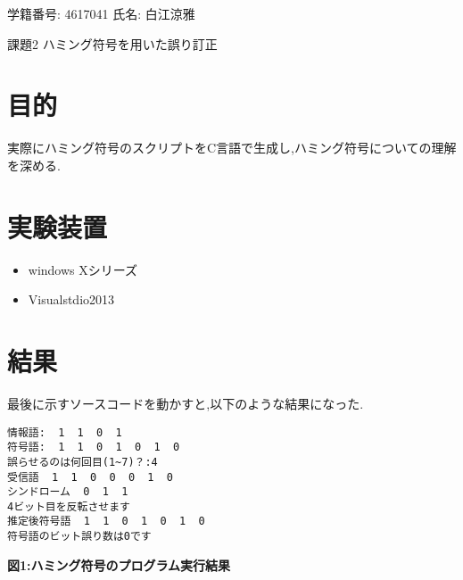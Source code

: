 \documentclass[12pt]{jarticle}
\begin{document}
\begin{center}
  学籍番号: 4617041 氏名: 白江涼雅
\end{center}

{\LARGE 課題2 ハミング符号を用いた誤り訂正}

\section{目的}
実際にハミング符号のスクリプトをC言語で生成し,ハミング符号についての理解を深める.

\section{実験装置}
\begin{itemize}
 \item windows Xシリーズ
 \item Visualstdio2013
\end{itemize}

\section{結果}
最後に示すソースコードを動かすと,以下のような結果になった.
\begin{center}  
\begin{screen}
\begin{verbatim}
情報語:  1  1  0  1
符号語:  1  1  0  1  0  1  0
誤らせるのは何回目(1~7)？:4
受信語  1  1  0  0  0  1  0
シンドローム  0  1  1
4ビット目を反転させます
推定後符号語  1  1  0  1  0  1  0
符号語のビット誤り数は0です
\end{verbatim}
\end{screen}
\textbf{図1:ハミング符号のプログラム実行結果}
\end{center}
\end{document}
